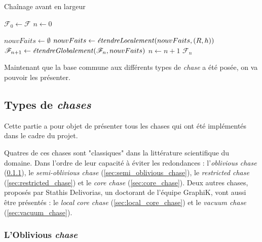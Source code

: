 \begin{algorithm}[!h]\label{algo:chainage_avant_largeur}
\caption{Chaînage avant en largeur}
\SetAlgoLined
\DontPrintSemicolon


$\mathcal{F}_0 \gets \mathcal{F}$\;
$n \gets 0$\;

{
    $nouvFaits\gets \emptyset$ \;
    {
        {
            {
                $nouvFaits \leftarrow \mbox{\textit{étendreLocalement}}(nouvFaits, (R,h))$\;
            }
        }
    }
    $\mathcal{F}_{n+1} \gets \mbox{\textit{étendreGlobalement}}(\mathcal{F}_{n}, nouvFaits)$\;
    $n \gets n + 1$\;
}
\Return $\mathcal{F}_n$
\end{algorithm}

Maintenant que la base commune aux différents types de \textit{chase} a été posée, on va pouvoir les présenter.

\subsection{Types de \textit{chases}}\label{subsec:types_chases}

Cette partie a pour objet de présenter tous les chases qui ont été implémentés dans le cadre du projet.
\par Quatres de ces chases sont "classiques" dans la littérature scientifique du domaine. Dans l'ordre de leur capacité à éviter les redondances : l'\textit{oblivious chase}\cite{Cali:2013:TIC:2591248.2591252} (\ref{sec:oblivious_chase}), le \textit{semi-oblivious chase}\cite{Marnette:2009:GST:1559795.1559799} (\ref{sec:semi_oblivious_chase}), le \textit{restricted chase}\cite{FAGIN200589} (\ref{sec:restricted_chase}) et le \textit{core chase}\cite{Deutsch:2008:CR:1376916.1376938} (\ref{sec:core_chase}). 
 Deux autres chases, proposés par Stathis Delivorias, un doctorant de l'équipe GraphiK, vont aussi être présentés : le \textit{local core chase} (\ref{sec:local_core_chase}) et le \textit{vacuum chase} (\ref{sec:vacuum_chase}).

\subsubsection{L'Oblivious \textit{chase}}\label{sec:oblivious_chase}

